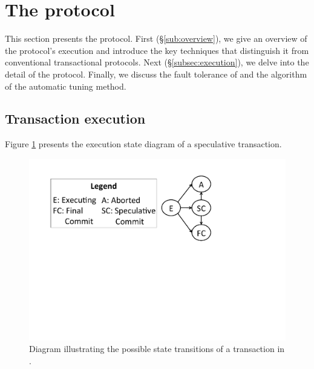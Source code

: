 \section{The \specula protocol}
\label{sec:protocol}
This section presents the \specula protocol. First (\S \ref{sub:overview}), we give an overview of the protocol's execution and introduce the key techniques that distinguish it from conventional transactional protocols. Next (\S \ref{subsec:execution}), we delve into the detail of the protocol. Finally, we discuss the fault tolerance of \specula and the algorithm of the automatic tuning method.

\iffalse
\subsection{Transaction execution}
Figure \ref{fig:txn_state} presents the execution state diagram of a speculative transaction.

\begin{figure}[t]
\centering
\hspace{-6mm}
\includegraphics[scale = 0.3]{figures/state-machine.pdf}
\caption{Diagram illustrating the possible state transitions of a transaction in \specula.}
\label{fig:txn_state}
\end{figure}


